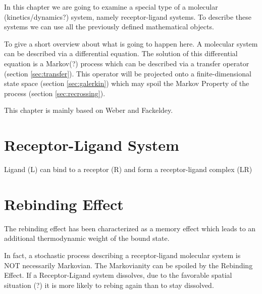 \label{chap:rebinding}

In this chapter we are going to examine a special type of a molecular (kinetics/dynamics?) system, namely receptor-ligand systems.
To describe these systems we can use all the previously defined mathematical objects.

To give a short overview about what is going to happen here. A molecular system can be described via a differential equation. The solution of this differential equation is a Markov(?) process which can be described via a transfer operator (section \ref{sec:transfer}). This operator will be projected onto a finite-dimensional state space (section \ref{sec:galerkin}) which may spoil the Markov Property of the process (section \ref{sec:recrossing}).


This chapter is mainly based on Weber and Fackeldey\cite{weber2014}.


\section{Receptor-Ligand System}

Ligand (L) can bind to a receptor (R) and form a receptor-ligand complex (LR)


\section{Rebinding Effect}

The rebinding effect has been characterized as a memory effect which leads to an additional thermodynamic weight of the bound state.

In fact, a stochastic process describing a receptor-ligand molecular system is NOT necessarily Markovian. The Markovianity can be spoiled by the Rebinding Effect. If a Receptor-Ligand system dissolves, due to the favorable spatial situation (?) it is more likely to rebing again than to stay dissolved. %

